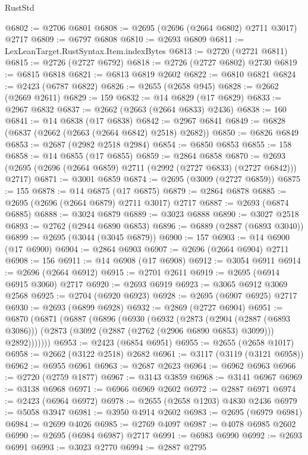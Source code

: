 \begin{lexlean}{RustStd}
\begin{coremodule}
@6802 := @2706 @6801
@6808 := @2695 (@2696 (@2664 @6802) @2711 @3017) @2717
@6809 := @6797 @6808
@6810 := @2693 @6809
@6811 := LexLeanTarget.RustSyntax.Item.indexBytes
@6813 := @2720 (@2721 @6811)
@6815 := @2726 (@2727 @6792)
@6818 := @2726 (@2727 @6802) @2730
@6819 := @6815 @6818
@6821 := @6813 @6819 @2602
@6822 := @6810 @6821
@6824 := @2423 (@6787 @6822)
@6826 := @2655 (@2658 @945)
@6828 := @2662 (@2669 @2611)
@6829 := 159
@6832 := @14 @6829 (@17 @6829)
@6833 := @2967 @6832
@6837 := @2662 (@2663 (@2664 @6833) @2436)
@6838 := 160
@6841 := @14 @6838 (@17 @6838)
@6842 := @2967 @6841
@6849 := @6828 (@6837 (@2662 (@2663 (@2664 @6842) @2518) @2682))
@6850 := @6826 @6849
@6853 := @2687 (@2982 @2518 @2984)
@6854 := @6850 @6853
@6855 := 158
@6858 := @14 @6855 (@17 @6855)
@6859 := @2864 @6858
@6870 := @2693 (@2695 (@2696 (@2664 @6859) @2711 (@2992 (@2727 @6833) (@2727 @6842))) @2717)
@6871 := @3001 @6859
@6874 := @2695 (@3009 (@2727 @6859))
@6875 := 155
@6878 := @14 @6875 (@17 @6875)
@6879 := @2864 @6878
@6885 := @2695 (@2696 (@2664 @6879) @2711 @3017) @2717
@6887 := @2693 (@6874 @6885)
@6888 := @3024 @6879
@6889 := @3023 @6888
@6890 := @3027 @2518
@6893 := @2762 (@2944 @6890 @6853)
@6896 := @6889 (@2887 (@6893 @3040))
@6899 := @2695 (@3044 (@3045 @6879))
@6900 := 157
@6903 := @14 @6900 (@17 @6900)
@6904 := @2864 @6903
@6907 := @2696 (@2664 @6904) @2711
@6908 := 156
@6911 := @14 @6908 (@17 @6908)
@6912 := @3054 @6911
@6914 := @2696 (@2664 @6912)
@6915 := @2701 @2611
@6919 := @2695 (@6914 @6915 @3060) @2717
@6920 := @2693 @6919
@6923 := @3065 @6912 @3069 @2568
@6925 := @2704 (@6920 @6923)
@6928 := @2695 (@6907 @6925) @2717
@6930 := @2693 (@6899 @6928)
@6932 := @2869 (@2727 @6904)
@6951 := @6870
    (@6871
      (@6887
        (@6896
          (@6930
            (@6932
              (@2873
                (@2904 (@2887 (@6893 @3086)))
                (@2873 (@3092 (@2887 (@2762 (@2906 @6890 @6853) @3099))) @2892)))))))
@6953 := @2423 (@6854 @6951)
@6955 := @2655 (@2658 @1017)
@6958 := @2662 (@3122 @2518) @2682
@6961 := @3117 (@3119 (@3121 @6958))
@6962 := @6955 @6961
@6963 := @2687 @2623
@6964 := @6962 @6963
@6966 := @2720 (@2759 @1877)
@6967 := @3143 @3859
@6968 := @3141 @6967
@6969 := @3138 @6968
@6971 := @6966 @6969 @2602
@6972 := @2887 @6971
@6974 := @2423 (@6964 @6972)
@6978 := @2655 (@2658 @1203) @4830 @2436
@6979 := @5058 @3947
@6981 := @3950 @4914 @2602
@6983 := @2695 (@6979 @6981)
@6984 := @2699 @4026
@6985 := @2769 @4097
@6987 := @4078 @6985 @2602
@6990 := @2695 (@6984 @6987) @2717
@6991 := @6983 @6990
@6992 := @2693 @6991
@6993 := @3023 @2770
@6994 := @2887 @2795

\end{coremodule}
\end{lexlean}
